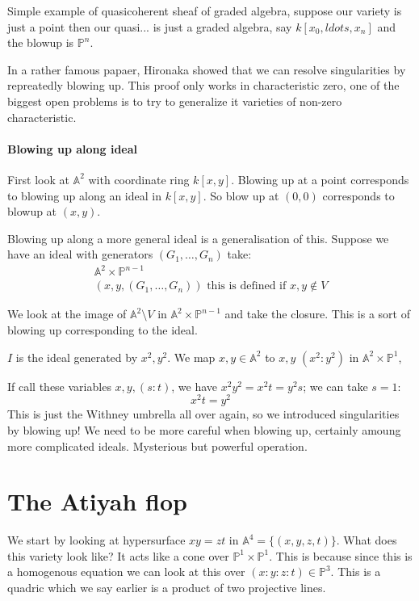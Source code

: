 \begin{example}
    Simple example of quasicoherent sheaf of graded algebra, suppose our variety is just a point then our quasi... is just a graded algebra, say $k[x_0,ldots,x_n]$ and the blowup is $\mathbb{P}^n$.
\end{example}

In a rather famous papaer, Hironaka showed that we can resolve singularities by repreatedly blowing up. This proof only works in characteristic zero, one of the biggest open problems is to try to generalize it varieties of non-zero characteristic.



\paragraph*{Blowing up along ideal}\begin{example}
    First look at $\mathbb{A}^2$ with coordinate ring $k[x,y]$. Blowing up at a point corresponds to blowing up along an ideal in $k[x,y]$. So blow up at $(0,0)$ corresponds to blowup at $(x,y)$. 

Blowing up along a more general ideal is a generalisation of this. Suppose we have an ideal with generators $(G_1,\ldots,G_n)$ take:\[\begin{array}{c}
    \mathbb{A}^2\times \mathbb{P}^{n-1}\\
    (x,y, (G_1,\ldots,G_n)) \text{ this is defined if }x,y\not\in V
\end{array}\]

We look at the image of $\mathbb{A}^2\setminus V$ in $\mathbb{A}^2\times \mathbb{P}^{n-1}$ and take the closure. This is a sort of blowing up corresponding to the ideal.
\end{example}

\begin{example}
    $I$ is the ideal generated by $x^2,y^2$. We map $x,y\in \mathbb{A}^2$ to $x,y$ $(x^2\colon y^2)$ in $\mathbb{A}^2\times \mathbb{P}^1$,

    If call these variables $x,y,(s\colon t)$, we have ${x^2}{y^2} = x^2t = y^2s$; we can take $s=1$: \[x^2t = y^2\]
    This is just the Withney umbrella all over again, so we introduced singularities by blowing up! We need to be more careful when blowing up, certainly amoung more complicated ideals. Mysterious but powerful operation. 
\end{example}


\section{The Atiyah flop}
We start by looking at hypersurface $xy=zt$ in $\mathbb{A}^4 = \{(x,y,z,t)\}$. What does this variety look like? It acts like a cone over $\mathbb{P}^1\times\mathbb{P}^1$. This is because since this is a homogenous equation we can look at this over $(x\colon y\colon z\colon t)\in \mathbb{P}^3$.
This is a quadric which we say earlier is a product of two projective lines.

